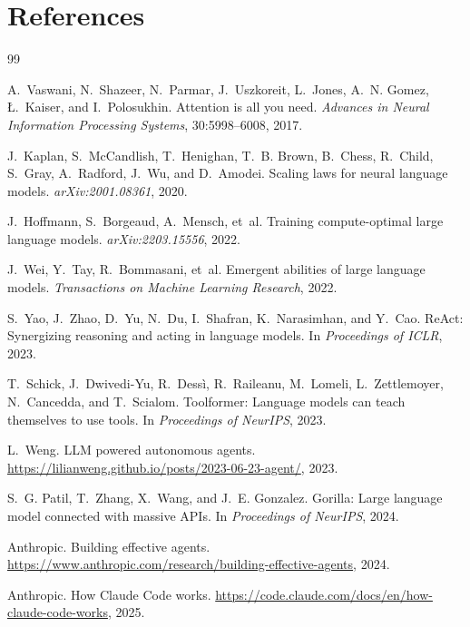 \chapter*{References}

\begin{thebibliography}{99}

A.~Vaswani, N.~Shazeer, N.~Parmar, J.~Uszkoreit, L.~Jones, A.~N. Gomez, \L.~Kaiser, and I.~Polosukhin. Attention is all you need. \emph{Advances in Neural Information Processing Systems}, 30:5998--6008, 2017.

J.~Kaplan, S.~McCandlish, T.~Henighan, T.~B. Brown, B.~Chess, R.~Child, S.~Gray, A.~Radford, J.~Wu, and D.~Amodei. Scaling laws for neural language models. \emph{arXiv:2001.08361}, 2020.

J.~Hoffmann, S.~Borgeaud, A.~Mensch, et~al. Training compute-optimal large language models. \emph{arXiv:2203.15556}, 2022.

J.~Wei, Y.~Tay, R.~Bommasani, et~al. Emergent abilities of large language models. \emph{Transactions on Machine Learning Research}, 2022.

S.~Yao, J.~Zhao, D.~Yu, N.~Du, I.~Shafran, K.~Narasimhan, and Y.~Cao. ReAct: Synergizing reasoning and acting in language models. In \emph{Proceedings of ICLR}, 2023.

T.~Schick, J.~Dwivedi-Yu, R.~Dess\`i, R.~Raileanu, M.~Lomeli, L.~Zettlemoyer, N.~Cancedda, and T.~Scialom. Toolformer: Language models can teach themselves to use tools. In \emph{Proceedings of NeurIPS}, 2023.

L.~Weng. LLM powered autonomous agents. \url{https://lilianweng.github.io/posts/2023-06-23-agent/}, 2023.

S.~G. Patil, T.~Zhang, X.~Wang, and J.~E. Gonzalez. Gorilla: Large language model connected with massive APIs. In \emph{Proceedings of NeurIPS}, 2024.

Anthropic. Building effective agents. \url{https://www.anthropic.com/research/building-effective-agents}, 2024.

Anthropic. How Claude Code works. \url{https://code.claude.com/docs/en/how-claude-code-works}, 2025.


\end{thebibliography}
